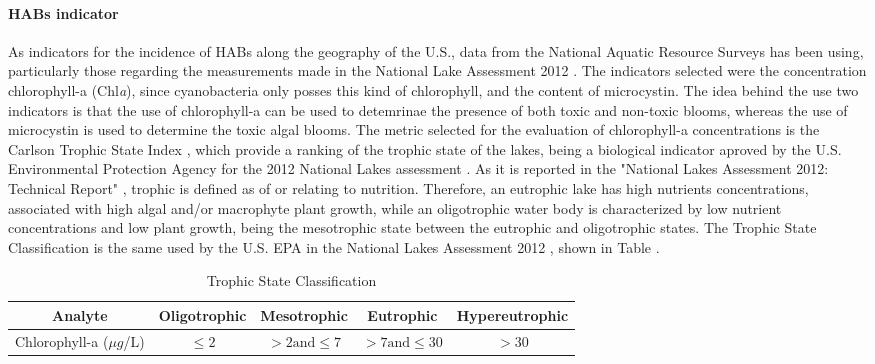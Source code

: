 \documentclass[10pt,a4paper]{article}
\begin{document}
\paragraph{HABs indicator}
As indicators for the incidence of HABs along the geography of the U.S., data from the National Aquatic Resource Surveys has been using, particularly those regarding the measurements made in the National Lake Assessment 2012 \cite{NLA2012QAPP}. The indicators selected were the concentration chlorophyll-a (Chl\emph{a}), since cyanobacteria only posses this kind of chlorophyll, and the content of microcystin. The idea behind the use two indicators is that the use of chlorophyll-a can be used to detemrinae the presence of both toxic and non-toxic blooms, whereas the use of microcystin is used to determine the toxic algal blooms. The metric selected for the evaluation of chlorophyll-a concentrations is the Carlson Trophic State Index \cite{CarlsonTSI}, which provide a ranking of the trophic state of the lakes, being a biological indicator aproved by the U.S. Environmental Protection Agency for the 2012 National Lakes assessment \cite{NLA2012QAPP}. As it is reported in the "National Lakes Assessment 2012: Technical Report" \cite{NLA2012techrep}, trophic is defined as of or relating to nutrition. Therefore, an eutrophic lake has high nutrients concentrations, associated with high algal and/or macrophyte plant growth, while an oligotrophic water body is characterized by low nutrient concentrations and low plant growth, being the mesotrophic state between the eutrophic and oligotrophic states. The Trophic State Classification is the same used by the U.S. EPA in the National Lakes Assessment 2012 \cite{NLA2012techrep}, shown in Table \cite{table:TSIclassification}.

\begin{table}[H] 
	\begin{adjustwidth}{}{}
		\centering
		\caption{Trophic State Classification \cite{NLA2012techrep}} \label{table:TSIclassification}
		\begin{tabular}{c c c c c}
			\toprule
			Analyte & Oligotrophic & Mesotrophic & Eutrophic & Hypereutrophic	\\ \midrule
			Chlorophyll-a ($\mu g$/L) & $\leq 2$ &  $>2 \text{and} \leq 7$ & $>7 \text{and} \leq 30$ & $>30$ \\ 
			\bottomrule 
		\end{tabular}
	\end{adjustwidth}
\end{table}
\end{document}
